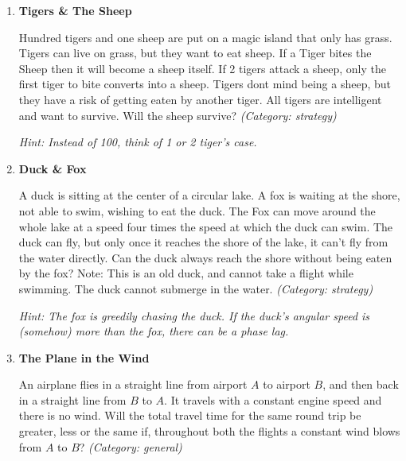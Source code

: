 \begin{enumerate}

\item \textbf{Tigers \& The Sheep}

Hundred tigers and one sheep are put on a magic island that only has grass. Tigers can live on grass, but they want to eat sheep. If a Tiger bites the Sheep then it will become a sheep itself. If 2 tigers attack a sheep, only the first tiger to bite converts into a sheep. Tigers dont mind being a sheep, but they have a risk of getting eaten by another tiger. All tigers are intelligent and want to survive. Will the sheep survive?
\small\emph{(Category: strategy)}

\small\emph{Hint: Instead of 100, think of 1 or 2 tiger's case.}





\item \textbf{Duck \& Fox}

A duck is sitting at the center of a circular lake. A fox is waiting at the shore, not able to swim, wishing to eat the duck. The Fox can move around the whole lake at a speed four times the speed at which the duck can swim. The duck can fly, but only once it reaches the shore of the lake, it can't fly from the water directly. Can the duck always reach the shore without being eaten by the fox?
Note: This is an old duck, and cannot take a flight while swimming. The duck cannot submerge in the water.
\small\emph{(Category: strategy)}

\small\emph{Hint: The fox is greedily chasing the duck. If the duck's angular speed is (somehow) more than the fox, there can be a phase lag.}





\item \textbf{The Plane in the Wind}

An airplane flies in a straight line from airport $A$ to airport $B$, and then back in a straight line from $B$ to $A$. It travels with a constant engine speed and there is no wind. Will the total travel time for the same round trip be greater, less or the same if, throughout both the flights a constant wind blows from $A$ to $B$?
\small\emph{(Category: general)}


\end{enumerate}
